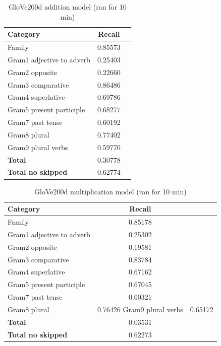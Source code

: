 \begin{center}
    
    
    \begin{table}[h!]
        \begin{tabular}{| l | c | r}
        	\hline
        	\textbf{Category} &    \textbf{Recall}\\ \hline
        	Family 						& 0.85573 \\
        	Gram1 adjective to adverb 	& 0.25403 \\
        	Gram2 opposite 				& 0.22660 \\
        	Gram3 comparative 			& 0.86486 \\
        	Gram4 superlative 			& 0.69786 \\
        	Gram5 present participle	& 0.68277 \\
        	Gram7 past tense 			& 0.60192 \\
        	Gram8 plural 				& 0.77402 \\
        	Gram9 plural verbs 			& 0.59770 \\
        	\textbf{Total}				& 0.30778 \\
        	\textbf{Total no skipped}	& 0.62774 \\ \hline
        \end{tabular}
    \caption{GloVe200d addition model (ran for 10 min)}
    \label{table:glove200d_addition}
    \end{table}
    
    \begin{table}[h!]
        \begin{tabular}{| l | c | r}
        	\hline
        	\textbf{Category} &    \textbf{Recall}\\ \hline
        	Family 						& 0.85178 \\
        	Gram1 adjective to adverb 	& 0.25302 \\
        	Gram2 opposite 				& 0.19581 \\
        	Gram3 comparative 			& 0.83784 \\
        	Gram4 superlative 			& 0.67162 \\
        	Gram5 present participle	& 0.67045 \\
        	Gram7 past tense 			& 0.60321 \\
        	Gram8 plural 				& 0.76426
        	Gram9 plural verbs 			& 0.65172 \\
        	\textbf{Total}				& 0.03531 \\
        	\textbf{Total no skipped}	& 0.62273 \\ \hline
        \end{tabular}
    \caption{GloVe200d multiplication model (ran for 10 min)}
    \label{table:glove200d_multiplication}
    \end{table}
    

\end{center}
